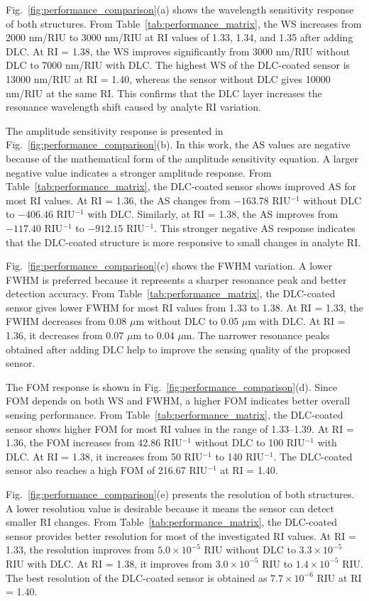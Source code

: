 \documentclass[preprint,12pt]{elsarticle}
\begin{document}
Fig.~\ref{fig:performance_comparison}(a) shows the wavelength sensitivity response of both structures. From Table~\ref{tab:performance_matrix}, the WS increases from 2000 nm/RIU to 3000 nm/RIU at RI values of 1.33, 1.34, and 1.35 after adding DLC. At RI = 1.38, the WS improves significantly from 3000 nm/RIU without DLC to 7000 nm/RIU with DLC. The highest WS of the DLC-coated sensor is 13000 nm/RIU at RI = 1.40, whereas the sensor without DLC gives 10000 nm/RIU at the same RI. This confirms that the DLC layer increases the resonance wavelength shift caused by analyte RI variation.

The amplitude sensitivity response is presented in Fig.~\ref{fig:performance_comparison}(b). In this work, the AS values are negative because of the mathematical form of the amplitude sensitivity equation. A larger negative value indicates a stronger amplitude response. From Table~\ref{tab:performance_matrix}, the DLC-coated sensor shows improved AS for most RI values. At RI = 1.36, the AS changes from $-163.78$ RIU$^{-1}$ without DLC to $-406.46$ RIU$^{-1}$ with DLC. Similarly, at RI = 1.38, the AS improves from $-117.40$ RIU$^{-1}$ to $-912.15$ RIU$^{-1}$. This stronger negative AS response indicates that the DLC-coated structure is more responsive to small changes in analyte RI.

Fig.~\ref{fig:performance_comparison}(c) shows the FWHM variation. A lower FWHM is preferred because it represents a sharper resonance peak and better detection accuracy. From Table~\ref{tab:performance_matrix}, the DLC-coated sensor gives lower FWHM for most RI values from 1.33 to 1.38. At RI = 1.33, the FWHM decreases from 0.08 $\mu$m without DLC to 0.05 $\mu$m with DLC. At RI = 1.36, it decreases from 0.07 $\mu$m to 0.04 $\mu$m. The narrower resonance peaks obtained after adding DLC help to improve the sensing quality of the proposed sensor.

The FOM response is shown in Fig.~\ref{fig:performance_comparison}(d). Since FOM depends on both WS and FWHM, a higher FOM indicates better overall sensing performance. From Table~\ref{tab:performance_matrix}, the DLC-coated sensor shows higher FOM for most RI values in the range of 1.33--1.39. At RI = 1.36, the FOM increases from 42.86 RIU$^{-1}$ without DLC to 100 RIU$^{-1}$ with DLC. At RI = 1.38, it increases from 50 RIU$^{-1}$ to 140 RIU$^{-1}$. The DLC-coated sensor also reaches a high FOM of 216.67 RIU$^{-1}$ at RI = 1.40.

Fig.~\ref{fig:performance_comparison}(e) presents the resolution of both structures. A lower resolution value is desirable because it means the sensor can detect smaller RI changes. From Table~\ref{tab:performance_matrix}, the DLC-coated sensor provides better resolution for most of the investigated RI values. At RI = 1.33, the resolution improves from $5.0\times10^{-5}$ RIU without DLC to $3.3\times10^{-5}$ RIU with DLC. At RI = 1.38, it improves from $3.0\times10^{-5}$ RIU to $1.4\times10^{-5}$ RIU. The best resolution of the DLC-coated sensor is obtained as $7.7\times10^{-6}$ RIU at RI = 1.40.
\end{document}
